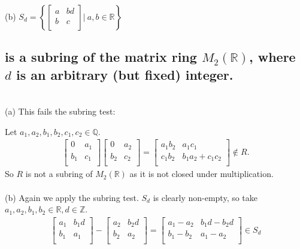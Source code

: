 \documentclass{article}
\begin{document}
(b) \(S_d = \left\{
  \left[ {\begin{array}{cc}
   a & bd \\
   b & c \\
  \end{array} } \right] \rvert\: a,b \in \mathds{R} \right\}
\)
\subsection*{is a subring of the matrix ring \(M_2(\mathds{R})\), where \(d\) is an arbitrary (but fixed) integer.}
\solution
\\(a) This fails the subring test:

Let \(a_1, a_2, b_1, b_2, c_1, c_2 \in \mathds{Q}\).
\begin{align*}
	\left[ {\begin{array}{cc}
   0 & a_1 \\
   b_1 & c_1 \\
  \end{array} } \right]
  \left[ {\begin{array}{cc}
   0 & a_2 \\
   b_2 & c_2 \\
  \end{array} } \right] = 
  \left[ {\begin{array}{cc}
   a_1 b_2 & a_1 c_1 \\
   c_1 b_2 & b_1 a_2 + c_1 c_2 \\
  \end{array} } \right] \notin R.
\end{align*}
So \(R\) is not a subring of \(M_2(\mathds{R})\) as it is not closed under multiplication.
\\\\
(b) Again we apply the subring test. \(S_d\) is clearly non-empty, so take \(a_1, a_2, b_1, b_2 \in \mathds{R}, d \in \mathds{Z}\).
\begin{align*}
	\left[ {\begin{array}{cc}
   a_1 & b_1 d \\
   b_1 & a_1 \\
  \end{array} } \right] - 
  \left[ {\begin{array}{cc}
   a_2 & b_2 d \\
   b_2 & a_2 \\
  \end{array} } \right] = 
  \left[ {\begin{array}{cc}
   a_1 - a_2 & b_1 d - b_2 d \\
   b_1 - b_2 & a_1 - a_2 \\
  \end{array} } \right] \in S_d
\end{align*}
\end{document}
